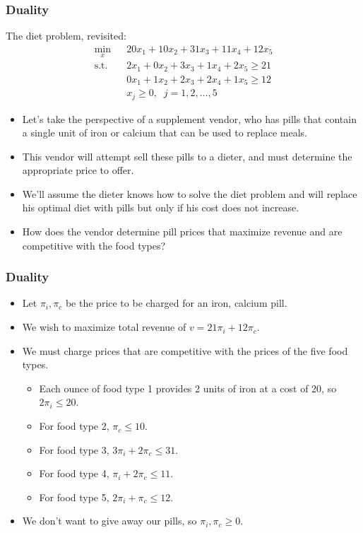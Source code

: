 \documentclass[12pt,handout]{beamer}
\begin{document}
\begin{frame}
\frametitle{Duality}
The diet problem, revisited:
\begin{eqnarray}
\min_x && 20x_1 + 10x_2 + 31x_3 + 11x_4 + 12x_5 \nonumber \\
\mbox{s.t.} && 2x_1 + 0x_2 + 3x_3 + 1x_4 + 2x_5 \ge 21 \nonumber \\
&& 0x_1 + 1x_2 + 2x_3 + 2x_4 + 1x_5 \ge 12 \nonumber \\
&& x_j \ge 0,\;\;j=1,2,\ldots, 5 \nonumber
\end{eqnarray}
\begin{itemize}
\item Let's take the perspective of a supplement vendor, who has pills that contain a single unit of iron or calcium that can be used to replace meals. 
\item This vendor will attempt sell these pills to a dieter, and must determine the appropriate price to offer. 
\item We'll assume the dieter knows how to solve the diet problem and will replace his optimal diet with pills but only if his cost does not increase.
\item How does the vendor determine pill prices that maximize revenue and are competitive with the food types?
\end{itemize}
\end{frame}

\begin{frame}
\frametitle{Duality}
\begin{itemize}
\item Let $\pi_i, \pi_c$ be the price to be charged for an iron, calcium pill.
\item We wish to maximize total revenue of $v = 21 \pi_i + 12 \pi_c$.
\item We must charge prices that are competitive with the prices of the five food types.
    \begin{itemize}
    \item Each ounce of food type 1 provides 2 units of iron at a cost of 20, so $2\pi_i \le 20$.
    \item For food type 2, $\pi_c \le 10$.
    \item For food type 3, $3\pi_i + 2\pi_c \le 31$.
    \item For food type 4, $\pi_i + 2\pi_c \le 11$.
    \item For food type 5, $2\pi_i + \pi_c \le 12$.
    \end{itemize}
\item We don't want to give away our pills, so $\pi_i, \pi_c \ge 0$.
\end{itemize}
\end{frame}
\end{document}
